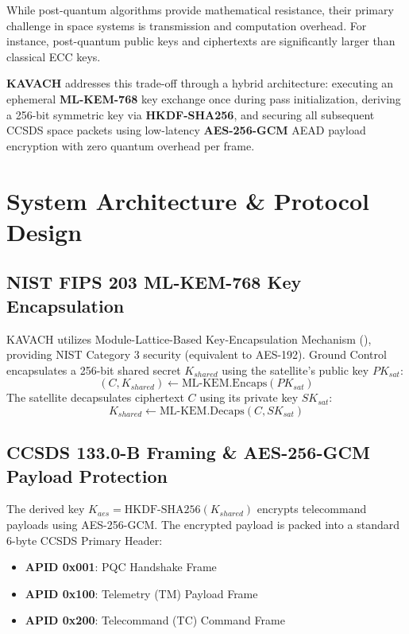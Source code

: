 \documentclass[conference]{IEEEtran}
\begin{document}
While post-quantum algorithms provide mathematical resistance, their primary challenge in space systems is transmission and computation overhead. For instance, post-quantum public keys and ciphertexts are significantly larger than classical ECC keys. 

\textbf{KAVACH} addresses this trade-off through a hybrid architecture: executing an ephemeral \textbf{ML-KEM-768} key exchange once during pass initialization, deriving a 256-bit symmetric key via \textbf{HKDF-SHA256}, and securing all subsequent CCSDS space packets using low-latency \textbf{AES-256-GCM} AEAD payload encryption with zero quantum overhead per frame.

\section{System Architecture \& Protocol Design}

\subsection{NIST FIPS 203 ML-KEM-768 Key Encapsulation}
KAVACH utilizes Module-Lattice-Based Key-Encapsulation Mechanism (), providing NIST Category 3 security (equivalent to AES-192). Ground Control encapsulates a 256-bit shared secret $K_{shared}$ using the satellite's public key $PK_{sat}$:
\begin{equation}
(C, K_{shared}) \leftarrow \text{ML-KEM.Encaps}(PK_{sat})
\end{equation}
The satellite decapsulates ciphertext $C$ using its private key $SK_{sat}$:
\begin{equation}
K_{shared} \leftarrow \text{ML-KEM.Decaps}(C, SK_{sat})
\end{equation}

\subsection{CCSDS 133.0-B Framing \& AES-256-GCM Payload Protection}
The derived key $K_{aes} = \text{HKDF-SHA256}(K_{shared})$ encrypts telecommand payloads using AES-256-GCM. The encrypted payload is packed into a standard 6-byte CCSDS Primary Header:
\begin{itemize}
    \item \textbf{APID 0x001}: PQC Handshake Frame
    \item \textbf{APID 0x100}: Telemetry (TM) Payload Frame
    \item \textbf{APID 0x200}: Telecommand (TC) Command Frame
\end{itemize}
\end{document}
